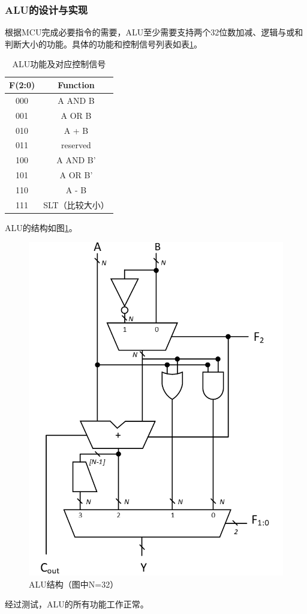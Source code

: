 \documentclass[a4paper]{article}
\begin{document}
			\subsubsection{ALU的设计与实现}
				根据MCU完成必要指令的需要，ALU至少需要支持两个32位数加减、逻辑与或和判断大小的功能。具体的功能和控制信号列表如表\ref{ALU function}。
				\begin{table}[htbp]
					\centering
					\begin{tabular}{c|c}
					\hline
					F(2:0) & Function \\ \hline
					000    & A AND B  \\ \hline
					001    & A OR B   \\ \hline
					010    & A + B    \\ \hline
					011    & reserved \\ \hline
					100    & A AND B' \\ \hline
					101    & A OR B'  \\ \hline
					110    & A - B    \\ \hline
					111    & SLT（比较大小）      \\ \hline
					\end{tabular}
					\caption{ALU功能及对应控制信号}
					\label{ALU function}
				\end{table}

				ALU的结构如图\ref{ALU structure}。
				\begin{figure}[htbp]
					\centering
					\includegraphics[scale=0.35]{ALU结构.png}
					\caption{ALU结构（图中N=32）}
					\label{ALU structure}
				\end{figure}
				经过测试，ALU的所有功能工作正常。
\end{document}
